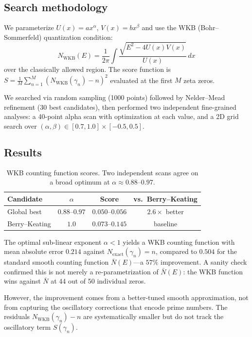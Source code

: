 \documentclass[11pt]{article}
\begin{document}
\subsection{Search methodology}

We parameterize $U(x) = ax^\alpha$, $V(x) = bx^\beta$ and use the WKB (Bohr--Sommerfeld)
quantization condition:
\[
N_{\mathrm{WKB}}(E) = \frac{1}{2\pi} \int \frac{\sqrt{E^2 - 4U(x)V(x)}}{U(x)}\, dx
\]
over the classically allowed region. The score function is
$S = \frac{1}{M}\sum_{n=1}^{M} (N_{\mathrm{WKB}}(\gamma_n) - n)^2$
evaluated at the first $M$ zeta zeros.

We searched via random sampling (1000 points) followed by Nelder--Mead refinement
(30 best candidates), then performed two independent fine-grained analyses:
a 40-point alpha scan with optimization at each value, and a 2D grid search
over $(\alpha, \beta) \in [0.7, 1.0] \times [-0.5, 0.5]$.

\subsection{Results}

\begin{table}[H]
\centering
\begin{tabular}{lccc}
\toprule
Candidate & $\alpha$ & Score & vs.\ Berry--Keating \\
\midrule
Global best & $0.88$--$0.97$ & $0.050$--$0.056$ & $2.6\times$ better \\
Berry--Keating & $1.0$ & $0.073$--$0.145$ & baseline \\
\bottomrule
\end{tabular}
\caption{WKB counting function scores. Two independent scans agree on a broad
optimum at $\alpha \approx 0.88$--$0.97$.}
\end{table}

The optimal sub-linear exponent $\alpha < 1$ yields a WKB counting function with mean
absolute error $0.214$ against $N_{\mathrm{exact}}(\gamma_n) = n$, compared to $0.504$
for the standard smooth counting function $\bar{N}(E)$---a $57\%$ improvement.
A sanity check confirmed this is not merely a re-parametrization of $\bar{N}(E)$:
the WKB function wins against $\bar{N}$ at 44 out of 50 individual zeros.

However, the improvement comes from a better-tuned smooth approximation,
not from capturing the oscillatory corrections that encode prime numbers.
The residuals $N_{\mathrm{WKB}}(\gamma_n) - n$ are systematically smaller
but do not track the oscillatory term $S(\gamma_n)$.
\end{document}
